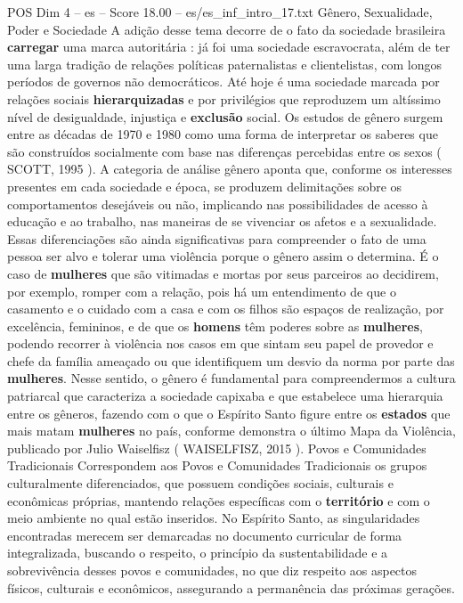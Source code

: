 \begin{textsample}{POS Dim 4 – es – Score 18.00 – es/es\_inf\_intro\_17.txt}
Gênero, Sexualidade, Poder e Sociedade A adição desse tema decorre de o fato da sociedade brasileira \textbf{carregar} uma marca autoritária : já foi uma sociedade escravocrata, além de ter uma larga tradição de relações políticas paternalistas e clientelistas, com longos períodos de governos não democráticos.
Até hoje é uma sociedade marcada por relações sociais \textbf{hierarquizadas} e por privilégios que reproduzem um altíssimo nível de desigualdade, injustiça e \textbf{exclusão} social.
Os estudos de gênero surgem entre as décadas de 1970 e 1980 como uma forma de interpretar os saberes que são construídos socialmente com base nas diferenças percebidas entre os sexos ( SCOTT, 1995 ).
A categoria de análise gênero aponta que, conforme os interesses presentes em cada sociedade e época, se produzem delimitações sobre os comportamentos desejáveis ou não, implicando nas possibilidades de acesso à educação e ao trabalho, nas maneiras de se vivenciar os afetos e a sexualidade.
Essas diferenciações são ainda significativas para compreender o fato de uma pessoa ser alvo e tolerar uma violência porque o gênero assim o determina.
É o caso de \textbf{mulheres} que são vitimadas e mortas por seus parceiros ao decidirem, por exemplo, romper com a relação, pois há um entendimento de que o casamento e o cuidado com a casa e com os filhos são espaços de realização, por excelência, femininos, e de que os \textbf{homens} têm poderes sobre as \textbf{mulheres}, podendo recorrer à violência nos casos em que sintam seu papel de provedor e chefe da família ameaçado ou que identifiquem um desvio da norma por parte das \textbf{mulheres}.
Nesse sentido, o gênero é fundamental para compreendermos a cultura patriarcal que caracteriza a sociedade capixaba e que estabelece uma hierarquia entre os gêneros, fazendo com o que o Espírito Santo figure entre os \textbf{estados} que mais matam \textbf{mulheres} no país, conforme demonstra o último Mapa da Violência, publicado por Julio Waiselfisz ( WAISELFISZ, 2015 ).
Povos e Comunidades Tradicionais Correspondem aos Povos e Comunidades Tradicionais os grupos culturalmente diferenciados, que possuem condições sociais, culturais e econômicas próprias, mantendo relações específicas com o \textbf{território} e com o meio ambiente no qual estão inseridos.
No Espírito Santo, as singularidades encontradas merecem ser demarcadas no documento curricular de forma integralizada, buscando o respeito, o princípio da sustentabilidade e a sobrevivência desses povos e comunidades, no que diz respeito aos aspectos físicos, culturais e econômicos, assegurando a permanência das próximas gerações.

\end{textsample}
